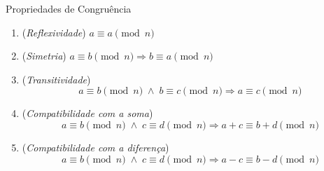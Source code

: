 \begin{frame}[fragile]{Propriedades de Congruência}
    \begin{enumerate}
        \item (\textit{Reflexividade}) $a \equiv a \pmod{n}$
        \item (\textit{Simetria}) $a \equiv b \pmod{n} \Longrightarrow b \equiv a \pmod{n}$
        \item (\textit{Transitividade})
            \begin{equation*}
                a \equiv b \pmod{n} \; \land \; b \equiv c \pmod{n} \Rightarrow a \equiv c \pmod{n}
            \end{equation*}
        \item (\textit{Compatibilidade com a soma})
            \begin{equation*}
                a \equiv b \pmod{n} \; \land \; c \equiv d \pmod{n} \Rightarrow a + c \equiv b + d \pmod{n}
            \end{equation*}
        \item (\textit{Compatibilidade com a diferença})
            \begin{equation*}
                a \equiv b \pmod{n} \; \land \; c \equiv d \pmod{n} \Rightarrow a - c \equiv b - d \pmod{n}
            \end{equation*}
    \end{enumerate}
\end{frame}

